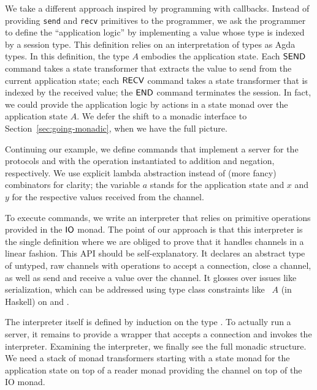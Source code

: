 \documentclass[acmsmall,screen,anonymous,review]{acmart}
\begin{document}
We take a different approach inspired by programming with
callbacks. Instead of providing \texttt{send} and \texttt{recv}
primitives to the programmer, we ask the programmer to define the
``application logic'' by implementing a value whose type {\ACommand} is indexed by
a session type. This definition relies on an interpretation of
types as Agda types.
\stTypeInterpretation
\stCommand
In this definition, the type $A$ embodies the application state. 
Each $\ACSEND$ command takes a state transformer that extracts the value to
send from the current application state; each $\ACRECV$ command takes
a state transformer that is indexed by the received value; the $\ACEND$
command terminates the session. In fact, we could provide the
application logic by actions in a state monad over the application
state $A$. We defer the shift to a monadic interface to Section~\ref{sec:going-monadic},
when we have the full picture.

Continuing our example, we define commands that implement a server
for the protocols {\Abinaryp} and {\Aunaryp} with the operation instantiated to
addition and negation, respectively.
\stAddpCommand
\stNegpCommand
We use explicit lambda abstraction instead of (more fancy) combinators
for clarity; the variable $a$ stands for the application state and $x$ and $y$ for
the respective values received from the channel. 

To execute commands, we write an
interpreter that relies on primitive operations provided
in the $\AIO$ monad. The point of our approach is that this
interpreter is the single definition where we are obliged to prove
that it handles channels in a linear fashion. 
\stPostulates
This API should be self-explanatory. It declares an abstract type of
untyped, raw channels with operations to accept a connection, close a channel, as
well as send and receive a value over the channel. It glosses over issues like
serialization, which can be addressed using type class constraints like
{\ASerialize~$A$} (in Haskell) on {\AprimSend} and {\AprimRecv}.

The interpreter itself is defined by induction on the type
{\ACommand}.
\stExecutorSignature\vspace{-1.5\baselineskip}
\stExecutor
To actually run a server, it remains to provide a wrapper that accepts
a connection and invokes the interpreter.
\stAcceptor
Examining the interpreter, we finally see the full monadic
structure. We need a stack of monad transformers starting with a state
monad for the application state on top of a reader monad providing the
channel on top of the IO monad. 
\end{document}

